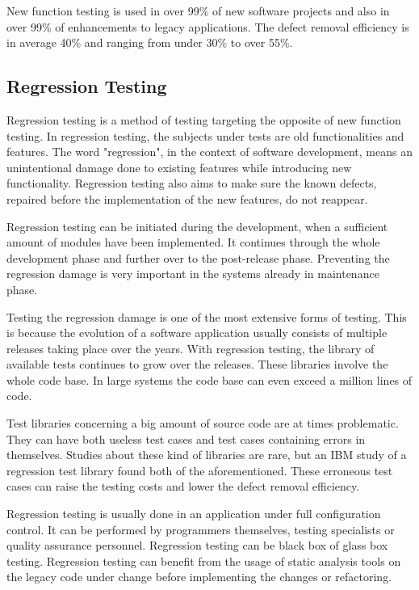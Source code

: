 New function testing is used in over 99\% of new software projects and also in over 99\% of enhancements to legacy applications. The defect removal efficiency is in average 40\% and ranging from under 30\% to over 55\%. 

 \subsection{Regression Testing}


Regression testing is a method of testing targeting the opposite of new function testing. In regression testing, the subjects under tests are old functionalities and features. The word "regression", in the context of software development, means an unintentional damage done to existing features while introducing new functionality. Regression testing also aims to make sure the known defects, repaired before the implementation of the new features, do not reappear.

Regression testing can be initiated during the development, when a sufficient amount of modules have been implemented. It continues through the whole development phase and further over to the post-release phase. Preventing the regression damage is very important in the systems already in maintenance phase.

Testing the regression damage is one of the most extensive forms of testing. This is because the evolution of a software application usually consists of multiple releases taking place over the years. With regression testing, the library of available tests continues to grow over the releases. These libraries involve the whole code base. In large systems the code base can even exceed a million lines of code.

Test libraries concerning a big amount of source code are at times problematic. They can have both useless test cases and test cases containing errors in themselves. Studies about these kind of libraries are rare, but an IBM study of a regression test library found both of the aforementioned. These erroneous test cases can raise the testing costs and lower the defect removal efficiency.

Regression testing is usually done in an application under full configuration control. It can be performed by programmers themselves, testing specialists or quality assurance personnel. Regression testing can be black box of glass box testing. Regression testing can benefit from the usage of static analysis tools on the legacy code under change before implementing the changes or refactoring.

